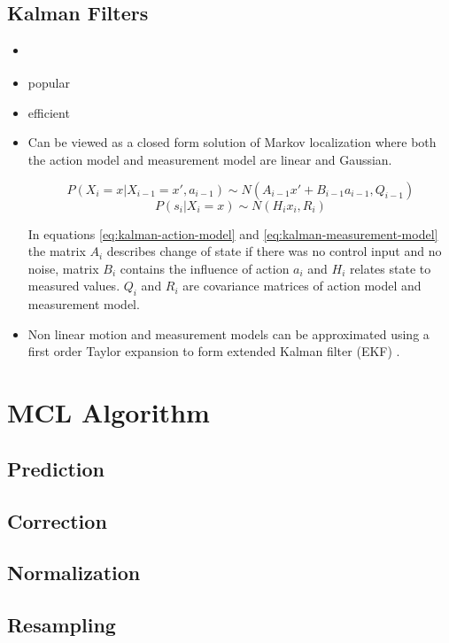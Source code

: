 

\subsection{Kalman Filters}
\label{sec:kalman}

\begin{itemize}
\item \cite{kalman60,welch95}
\item popular
\item efficient
\item Can be viewed as a closed form solution of Markov localization where both the
	action model and measurement model are linear and Gaussian.

	\begin{equation}
	\label{eq:kalman-action-model}
	P(X_i = x | X_{i-1} = x', a_{i - 1}) \sim N(A_{i - 1}x' + B_{i - 1}a_{i - 1}, Q_{i - 1})
	\end{equation}
	\begin{equation}
	\label{eq:kalman-measurement-model}
	P(s_{i} | X_i = x) \sim N(H_{i}x_{i}, R_i)
	\end{equation}
	
	In equations \eqref{eq:kalman-action-model} and \eqref{eq:kalman-measurement-model}
	the matrix \(A_i\) describes change of state if there was no control input and no noise,
	matrix \(B_i\) contains the influence of action \(a_i\) and \(H_i\) relates state to measured
	values.
	\(Q_i\) and \(R_i\) are covariance matrices of action model and measurement model.

\item Non linear motion and measurement models can be approximated 
	using a first order Taylor expansion to form extended Kalman
	filter (EKF) \cite{welch95}.
\end{itemize}

\section{MCL Algorithm}
\label{sec:mcl-algorithm}

\cite{dellaert99}

\subsection{Prediction}
\subsection{Correction}
\subsection{Normalization}
\subsection{Resampling}
